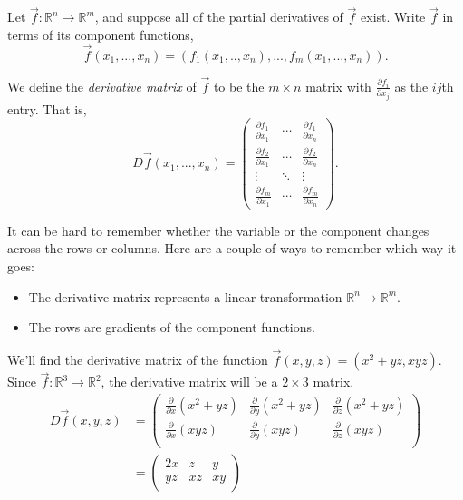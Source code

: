 \documentclass{ximera}
\begin{document}
\begin{definition}
Let $\vec{f}:\mathbb{R}^n\rightarrow\mathbb{R}^m$, and suppose all of the partial derivatives of $\vec{f}$ exist. Write $\vec{f}$ in terms of its component functions,
\[
\vec{f}(x_1,...,x_n) = (f_1(x_1,..,x_n),...,f_m(x_1,...,x_n)).
\]

We define the \emph{derivative matrix} of $\vec{f}$ to be the $m\times n$ matrix with $\frac{\partial f_i}{\partial x_j}$ as the $ij$th entry. That is,
\[
D\vec{f}(x_1,...,x_n) = \begin{pmatrix}
\frac{\partial f_1}{\partial x_1} & \cdots & \frac{\partial f_1}{\partial x_n}\\
\frac{\partial f_2}{\partial x_1} & \cdots & \frac{\partial f_2}{\partial x_n}\\
\vdots & \ddots & \vdots\\
\frac{\partial f_m}{\partial x_1} & \cdots & \frac{\partial f_m}{\partial x_n}
\end{pmatrix}.
\]
\end{definition}

It can be hard to remember whether the variable or the component changes across the rows or columns. Here are a couple of ways to remember which way it goes:
\begin{itemize}
\item The derivative matrix represents a linear transformation $\mathbb{R}^n\rightarrow\mathbb{R}^m$.
\item The rows are gradients of the component functions.
\end{itemize}

\begin{example}
We'll find the derivative matrix of the function $\vec{f}(x,y,z) = (x^2+yz, xyz)$. Since $\vec{f}:\mathbb{R}^3\rightarrow\mathbb{R}^2$, the derivative matrix will be a $2\times 3$ matrix.
\begin{align*}
D\vec{f}(x,y,z) &= \begin{pmatrix}
\frac{\partial}{\partial x} (x^2+yz) & \frac{\partial}{\partial y} (x^2+yz) & \frac{\partial}{\partial z} (x^2+yz)\\
\frac{\partial}{\partial x} (xyz) & \frac{\partial}{\partial y} (xyz) & \frac{\partial}{\partial z} (xyz)\\
\end{pmatrix}\\
& = \begin{pmatrix}
2x & z & y\\
yz & xz & xy\\
\end{pmatrix}
\end{align*}
\end{example}
\end{document}
